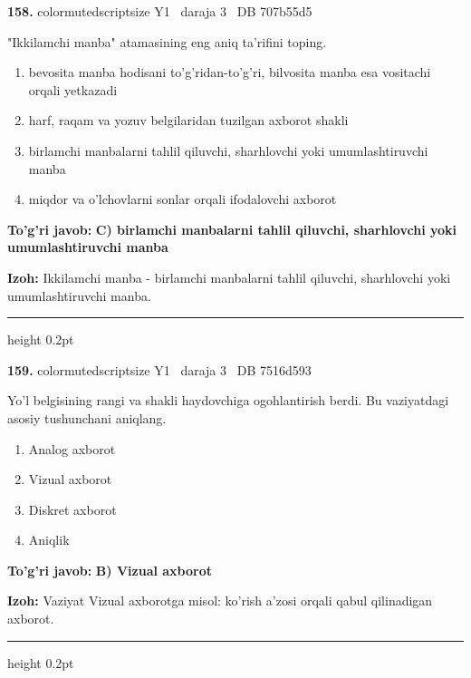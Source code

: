 \documentclass[10pt,a4paper,oneside]{article}
\begin{document}
\noindent\textbf{\color{ink}158.}  {color{muted}scriptsize Y1 \textbullet\ daraja 3 \textbullet\ DB 707b55d5}
\par
"Ikkilamchi manba" atamasining eng aniq ta'rifini toping.
\begin{enumerate}[label=\Alph*),leftmargin=9mm]
\item bevosita manba hodisani to'g'ridan-to'g'ri, bilvosita manba esa vositachi orqali yetkazadi
\item harf, raqam va yozuv belgilaridan tuzilgan axborot shakli
\item birlamchi manbalarni tahlil qiluvchi, sharhlovchi yoki umumlashtiruvchi manba
\item miqdor va o'lchovlarni sonlar orqali ifodalovchi axborot
\end{enumerate}
\begin{tcolorbox}[enhanced,breakable,colback=teal!4,colframe=teal!50!black,boxrule=0.5pt,arc=1.1mm,left=3mm,right=3mm,top=1.7mm,bottom=1.7mm,before skip=2mm,after skip=2mm]
\textbf{\color{teal}To'g'ri javob:} \textbf{C) birlamchi manbalarni tahlil qiluvchi, sharhlovchi yoki umumlashtiruvchi manba}
\par\smallskip
\textbf{Izoh:} Ikkilamchi manba - birlamchi manbalarni tahlil qiluvchi, sharhlovchi yoki umumlashtiruvchi manba.
\end{tcolorbox}
\vspace{2mm}\hrule height 0.2pt \vspace{3mm}

\noindent\textbf{\color{ink}159.}  {color{muted}scriptsize Y1 \textbullet\ daraja 3 \textbullet\ DB 7516d593}
\par
Yo'l belgisining rangi va shakli haydovchiga ogohlantirish berdi. Bu vaziyatdagi asosiy tushunchani aniqlang.
\begin{enumerate}[label=\Alph*),leftmargin=9mm]
\item Analog axborot
\item Vizual axborot
\item Diskret axborot
\item Aniqlik
\end{enumerate}
\begin{tcolorbox}[enhanced,breakable,colback=teal!4,colframe=teal!50!black,boxrule=0.5pt,arc=1.1mm,left=3mm,right=3mm,top=1.7mm,bottom=1.7mm,before skip=2mm,after skip=2mm]
\textbf{\color{teal}To'g'ri javob:} \textbf{B) Vizual axborot}
\par\smallskip
\textbf{Izoh:} Vaziyat Vizual axborotga misol: ko'rish a'zosi orqali qabul qilinadigan axborot.
\end{tcolorbox}
\vspace{2mm}\hrule height 0.2pt \vspace{3mm}
\end{document}
